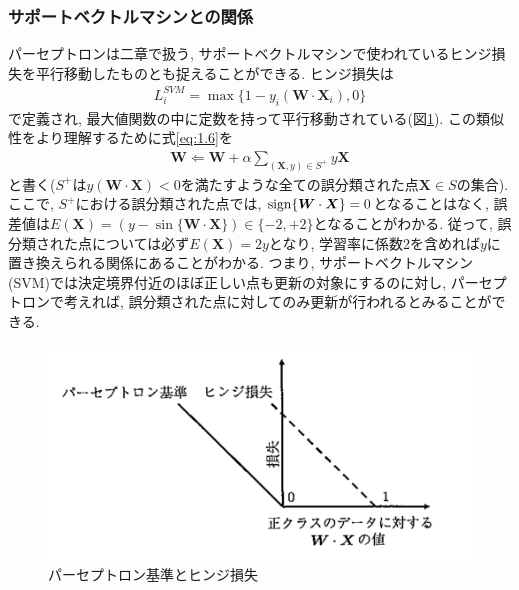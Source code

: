 \documentclass[dvipdfmx,report,11pt]{jsbook}
\begin{document}
\subsubsection{サポートベクトルマシンとの関係}
パーセプトロンは二章で扱う, サポートベクトルマシンで使われているヒンジ損失を平行移動したものとも捉えることができる. ヒンジ損失は
\begin{align}
  L_i^{SVM}=\operatorname{max}\{1-y_i(\bm{W}\cdot\bm{X}_i),0\}
\end{align}
で定義され, 最大値関数の中に定数を持って平行移動されている(図\ref{fig6}). この類似性をより理解するために式\eqref{eq:1.6}を
\begin{align}
  \bm{W}\Leftarrow \bm{W}+\alpha \sum_{(\bm{X},y)\in S^{+}}y\bm{X}
\end{align}
と書く($S^{+}$は$y(\bm{W\cdot\bm{X}})<0$を満たすような全ての誤分類された点$\bm{X}\in S$の集合). ここで, $S^+$における誤分類された点では, $\operatorname{sign}\{\bm{W}\cdot\bm{X}\}=0$となることはなく, 誤差値は$E(\bm{X})=(y-\sin\{\bm{W}\cdot\bm{X}\})\in\{-2,+2\}$となることがわかる. 従って, 誤分類された点については必ず$E(\bm{X})=2y$となり, 学習率に係数2を含めれば$y$に置き換えられる関係にあることがわかる. つまり, サポートベクトルマシン(SVM)では決定境界付近のほぼ正しい点も更新の対象にするのに対し, パーセプトロンで考えれば, 誤分類された点に対してのみ更新が行われるとみることができる.

\setcounter{figure}{5}
\begin{figure}[H]
  \centering
    \includegraphics[width=0.5\linewidth]{figure/fig6.png}
    \caption{パーセプトロン基準とヒンジ損失}
    \label{fig6}
\end{figure}
\end{document}
